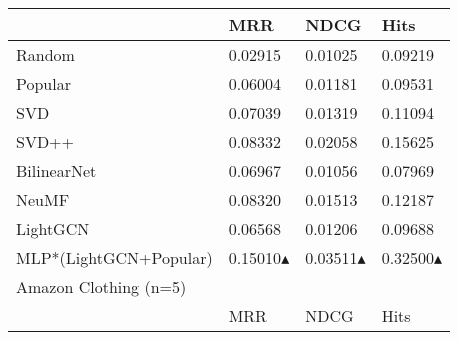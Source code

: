 \begin{tabular}{llll}
                       & MRR                                                    & NDCG                                                   & Hits                                                   \\\hline
 Random                & 0.02915                                                & 0.01025                                                & 0.09219                                                \\
 Popular               & 0.06004                                                & 0.01181                                                & 0.09531                                                \\
 SVD                   & 0.07039                                                & 0.01319                                                & 0.11094                                                \\
 SVD++                 & 0.08332                                                & 0.02058                                                & 0.15625                                                \\
 BilinearNet           & 0.06967                                                & 0.01056                                                & 0.07969                                                \\
 NeuMF                 & 0.08320                                                & 0.01513                                                & 0.12187                                                \\
 LightGCN              & 0.06568                                                & 0.01206                                                & 0.09688                                                \\
 MLP*(LightGCN+Popular) & 0.15010\textcolor[rgb]{00,0.45,0.10}{$\blacktriangle$} & 0.03511\textcolor[rgb]{00,0.45,0.10}{$\blacktriangle$} & 0.32500\textcolor[rgb]{00,0.45,0.10}{$\blacktriangle$} \\\hline
 Amazon Clothing (n=5)    &                                                        &                                                        &                                                        \\\hline
                       & MRR                                                    & NDCG                                                   & Hits                                                   \\\hline

\end{tabular}
